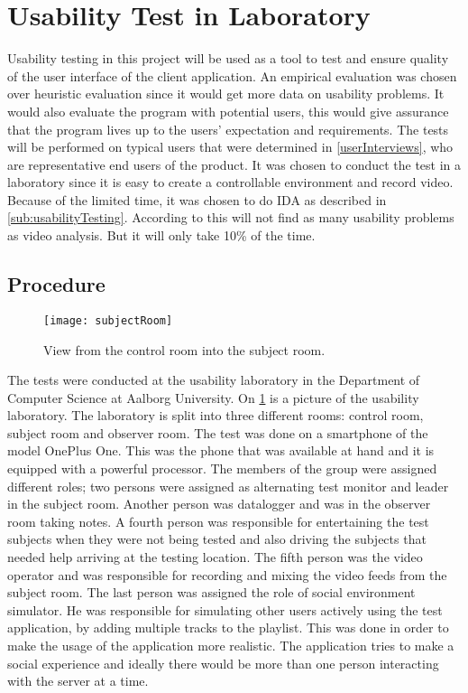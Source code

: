 \section{Usability Test in Laboratory}
Usability testing in this project will be used as a tool to test and
ensure quality of the user interface of the client application. An empirical evaluation was chosen over heuristic evaluation since it would get more data on usability problems. It would also evaluate the program with potential users, this would give assurance that the program lives up to the users' expectation and requirements. The tests will be performed on
typical users that were determined in \cref{userInterviews}, who are
representative end users of the product. It was chosen to conduct the
test in a laboratory since it is easy to create a controllable
environment and record video. Because of the limited time, it was
chosen to do IDA as described in \cref{sub:usabilityTesting}. According to \cite{kjeldskov2004instant} this will not find as many usability problems as video analysis. But it will only take 10\% of the time.

\subsection{Procedure}
\begin{figure}[hbtp]
  \centering
  \texttt{[image: subjectRoom]}
  \caption{View from the control room into the subject room.}\label{fig:subjectRoom}
\end{figure}

The tests were conducted at the usability laboratory in the Department of Computer Science at Aalborg University. On \cref{fig:subjectRoom} is a picture of the usability laboratory. The laboratory is split into three different rooms: control room, subject room and observer room. The test was done on a smartphone of the model OnePlus One. This was
the phone that was available at hand and it is equipped with a powerful
processor. The members of the group were assigned different roles; two
persons were assigned as alternating test monitor and
leader in the subject room. Another person was datalogger and was in
the observer room taking notes. A fourth person was responsible for entertaining the test
subjects when they were not being tested and also driving the subjects
that needed help arriving at the testing location. The fifth person
was the video operator and was responsible for recording and mixing
the video feeds from the subject room. The last person was assigned the role of social environment simulator. He was responsible for simulating other users actively using the test application, by adding multiple tracks to the playlist. This was done in order to make the usage of the application more realistic. The application tries to make a social experience and ideally there would be more than one person interacting with the server at a time.

